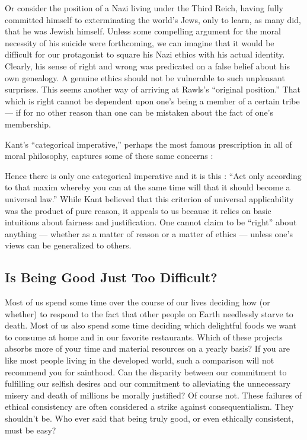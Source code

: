 \documentclass[a4paper,14pt]{extbook}
\begin{document}
Or consider the position of a Nazi living under the Third Reich, having fully committed himself to exterminating the world's Jews, only to learn, as many did, that he was Jewish himself.
Unless some compelling argument for the moral necessity of his suicide were forthcoming, we can imagine that it would be difficult for our protagonist to square his Nazi ethics with his actual identity.
Clearly, his sense of right and wrong was predicated on a false belief about his own genealogy.
A genuine ethics should not be vulnerable to such unpleasant surprises.
This seems another way of arriving at Rawls's ``original position.''
That which is right cannot be dependent upon one's being a member of a certain tribe --- if for no other reason than one can be mistaken about the fact of one's membership.

Kant's ``categorical imperative,'' perhaps the most famous prescription in all of moral philosophy, captures some of these same concerns :

Hence there is only one categorical imperative and it is this :
``Act only according to that maxim whereby you can at the same time will that it should become a universal law.''
While Kant believed that this criterion of universal applicability was the product of pure reason, it appeals to us because it relies on basic intuitions about fairness and justification.
One cannot claim to be ``right'' about anything --- whether as a matter of reason or a matter of ethics --- unless one's views can be generalized to others.

\subsection{Is Being Good Just Too Difficult?}

Most of us spend some time over the course of our lives deciding how (or whether) to respond to the fact that other people on Earth needlessly starve to death.
Most of us also spend some time deciding which delightful foods we want to consume at home and in our favorite restaurants.
Which of these projects absorbs more of your time and material resources on a yearly basis?
If you are like most people living in the developed world, such a comparison will not recommend you for sainthood.
Can the disparity between our commitment to fulfilling our selfish desires and our commitment to alleviating the unnecessary misery and death of millions be morally justified?
Of course not.
These failures of ethical consistency are often considered a strike against consequentialism.
They shouldn't be.
Who ever said that being truly good, or even ethically consistent, must be easy?
\end{document}
